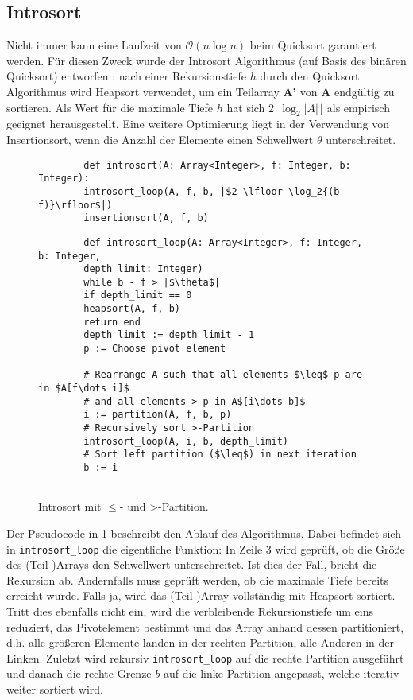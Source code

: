 \subsection{Introsort}
\label{section:introsort}

Nicht  immer kann eine Laufzeit von $\mathcal O(n\log{n})$ beim Quicksort garantiert werden.
Für diesen Zweck wurde der Introsort Algorithmus (auf Basis des binären Quicksort) entworfen \cite{Musser97}:
nach einer Rekursionstiefe $h$ durch den Quicksort Algorithmus wird Heapsort verwendet,
um ein Teilarray \textbf{A'} von \textbf{A} endgültig zu sortieren.
Als Wert für die maximale Tiefe $h$ hat sich $2 \lfloor \log_2{|A|}\rfloor$ als empirisch geeignet herausgestellt.
Eine weitere Optimierung liegt in der Verwendung von Insertionsort,
wenn die Anzahl der Elemente einen Schwellwert $\theta$ unterschreitet.

\begin{figure}
	\begin{verbatim}
		def introsort(A: Array<Integer>, f: Integer, b: Integer):
		introsort_loop(A, f, b, |$2 \lfloor \log_2{(b-f)}\rfloor$|)
		insertionsort(A, f, b)
	\end{verbatim}
	
	\begin{verbatim}
		def introsort_loop(A: Array<Integer>, f: Integer, b: Integer, 
		depth_limit: Integer)
		while b - f > |$\theta$|
		if depth_limit == 0
		heapsort(A, f, b)
		return end
		depth_limit := depth_limit - 1
		p := Choose pivot element
		
		# Rearrange A such that all elements $\leq$ p are in $A[f\dots i]$
		# and all elements > p in A$[i\dots b]$
		i := partition(A, f, b, p)
		# Recursively sort >-Partition
		introsort_loop(A, i, b, depth_limit)
		# Sort left partition ($\leq$) in next iteration
		b := i
		
	\end{verbatim}
	\caption{Introsort mit \glqq $\leq$\grqq- und \glqq >\grqq-Partition.}
	\label{alg:introsort}
\end{figure}

Der Pseudocode in \ref{alg:introsort} beschreibt den Ablauf des Algorithmus.
Dabei befindet sich in \texttt{introsort\_loop} die eigentliche Funktion: In Zeile 3 wird geprüft,
ob die Größe des (Teil-)Arrays den Schwellwert unterschreitet. Ist dies der Fall, bricht die Rekursion ab.
Andernfalls muss geprüft werden, ob die maximale Tiefe bereits erreicht wurde.
Falls ja, wird das (Teil-)Array vollständig mit Heapsort sortiert.
Tritt dies ebenfalls nicht ein, wird die verbleibende Rekursionstiefe um eins reduziert,
das Pivotelement bestimmt und das Array anhand dessen partitioniert,
d.h. alle größeren Elemente landen in der rechten Partition, alle Anderen in der Linken.
Zuletzt wird rekursiv \texttt{introsort\_loop} auf die rechte Partition ausgeführt
und danach die rechte Grenze $b$ auf die linke Partition angepasst, welche iterativ weiter sortiert wird.

